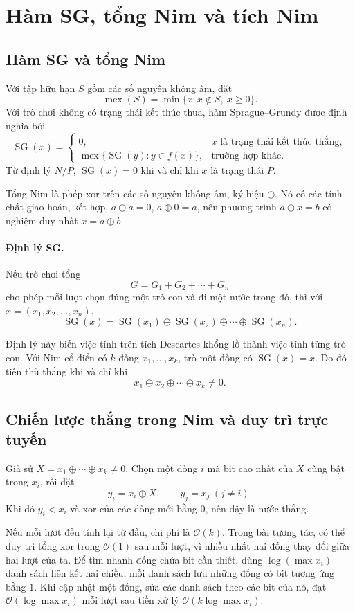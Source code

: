 \documentclass[11pt]{article}
\newcommand{\Oh}{\mathcal{O}}
\newcommand{\SG}{\operatorname{SG}}
\newcommand{\mex}{\operatorname{mex}}
\newcommand{\xor}{\oplus}
\begin{document}
\section{Hàm SG, tổng Nim và tích Nim}

\subsection{Hàm SG và tổng Nim}

Với tập hữu hạn \(S\) gồm các số nguyên không âm, đặt
\[
  \mex(S)=\min\{x:x\notin S,\ x\ge 0\}.
\]
Với trò chơi không có trạng thái kết thúc thua, hàm Sprague--Grundy được định
nghĩa bởi
\[
\SG(x)=
\begin{cases}
  0, & x\text{ là trạng thái kết thúc thắng},\\
  \mex\{\SG(y):y\in f(x)\}, & \text{trường hợp khác}.
\end{cases}
\]
Từ định lý \(N/P\), \(\SG(x)=0\) khi và chỉ khi \(x\) là trạng thái \(P\).

Tổng Nim là phép xor trên các số nguyên không âm, ký hiệu \(\xor\). Nó có các
tính chất giao hoán, kết hợp, \(a\xor a=0\), \(a\xor 0=a\), nên phương trình
\(a\xor x=b\) có nghiệm duy nhất \(x=a\xor b\).

\paragraph{Định lý SG.}
Nếu trò chơi tổng
\[
  G=G_1+G_2+\cdots+G_n
\]
cho phép mỗi lượt chọn đúng một trò con và đi một nước trong đó, thì với
\(x=(x_1,x_2,\ldots,x_n)\),
\[
  \SG(x)=\SG(x_1)\xor\SG(x_2)\xor\cdots\xor\SG(x_n).
\]

Định lý này biến việc tính trên tích Descartes khổng lồ thành việc tính từng
trò con. Với Nim cổ điển có \(k\) đống \(x_1,\ldots,x_k\), trò một đống có
\(\SG(x)=x\). Do đó tiên thủ thắng khi và chỉ khi
\[
  x_1\xor x_2\xor\cdots\xor x_k\ne 0.
\]

\subsection{Chiến lược thắng trong Nim và duy trì trực tuyến}

Giả sử \(X=x_1\xor\cdots\xor x_k\ne 0\). Chọn một đống \(i\) mà bit cao nhất
của \(X\) cũng bật trong \(x_i\), rồi đặt
\[
  y_i=x_i\xor X,\qquad y_j=x_j\ (j\ne i).
\]
Khi đó \(y_i<x_i\) và xor của các đống mới bằng \(0\), nên đây là nước thắng.

Nếu mỗi lượt đều tính lại từ đầu, chi phí là \(\Oh(k)\). Trong bài tương tác,
có thể duy trì tổng xor trong \(\Oh(1)\) sau mỗi lượt, vì nhiều nhất hai đống
thay đổi giữa hai lượt của ta. Để tìm nhanh đống chứa bit cần thiết, dùng
\(\log(\max x_i)\) danh sách liên kết hai chiều, mỗi danh sách lưu những đống
có bit tương ứng bằng \(1\). Khi cập nhật một đống, sửa các danh sách theo các
bit của nó, đạt \(\Oh(\log\max x_i)\) mỗi lượt sau tiền xử lý
\(\Oh(k\log\max x_i)\).
\end{document}
